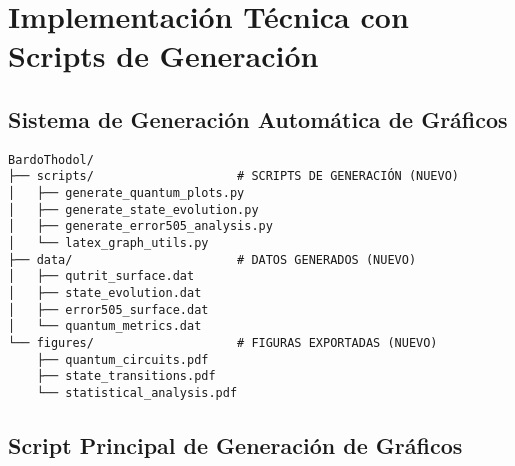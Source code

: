 \documentclass[12pt,a4paper]{article}
\begin{document}
\section{Implementación Técnica con Scripts de Generación}

\subsection{Sistema de Generación Automática de Gráficos}

\begin{verbatim}
BardoThodol/
├── scripts/                    # SCRIPTS DE GENERACIÓN (NUEVO)
│   ├── generate_quantum_plots.py
│   ├── generate_state_evolution.py
│   ├── generate_error505_analysis.py
│   └── latex_graph_utils.py
├── data/                       # DATOS GENERADOS (NUEVO)
│   ├── qutrit_surface.dat
│   ├── state_evolution.dat
│   ├── error505_surface.dat
│   └── quantum_metrics.dat
└── figures/                    # FIGURAS EXPORTADAS (NUEVO)
    ├── quantum_circuits.pdf
    ├── state_transitions.pdf
    └── statistical_analysis.pdf
\end{verbatim}

\subsection{Script Principal de Generación de Gráficos}
\end{document}

